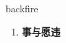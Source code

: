 
\begin{frame}
{\huge backfire}
\begin{center}
\begin{enumerate}\Large
  \item \textbf{事与愿违}
\end{enumerate}
\end{center}
\end{frame}
